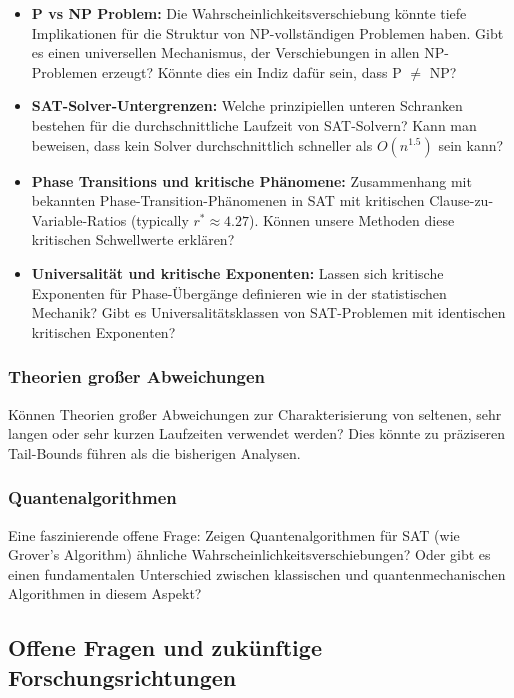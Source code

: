 ﻿\documentclass[a4paper,12pt]{article}
\theoremstyle{definition}
\begin{document}
\begin{itemize}
	\item \textbf{P vs NP Problem:} Die Wahrscheinlichkeitsverschiebung könnte tiefe Implikationen für die Struktur von NP-vollständigen Problemen haben. Gibt es einen universellen Mechanismus, der Verschiebungen in allen NP-Problemen erzeugt? Könnte dies ein Indiz dafür sein, dass P $\neq$ NP?
	
	\item \textbf{SAT-Solver-Untergrenzen:} Welche prinzipiellen unteren Schranken bestehen für die durchschnittliche Laufzeit von SAT-Solvern? Kann man beweisen, dass kein Solver durchschnittlich schneller als $O(n^{1.5})$ sein kann?
	
	\item \textbf{Phase Transitions und kritische Phänomene:} Zusammenhang mit bekannten Phase-Transition-Phänomenen in SAT mit kritischen Clause-zu-Variable-Ratios (typically $r^* \approx 4.27$). Können unsere Methoden diese kritischen Schwellwerte erklären?
	
	\item \textbf{Universalität und kritische Exponenten:} Lassen sich kritische Exponenten für Phase-Übergänge definieren wie in der statistischen Mechanik? Gibt es Universalitätsklassen von SAT-Problemen mit identischen kritischen Exponenten?
\end{itemize}

\subsubsection{Theorien großer Abweichungen}

Können Theorien großer Abweichungen zur Charakterisierung von seltenen, sehr langen oder sehr kurzen Laufzeiten verwendet werden? Dies könnte zu präziseren Tail-Bounds führen als die bisherigen Analysen.

\subsubsection{Quantenalgorithmen}

Eine faszinierende offene Frage: Zeigen Quantenalgorithmen für SAT (wie Grover's Algorithm) ähnliche Wahrscheinlichkeitsverschiebungen? Oder gibt es einen fundamentalen Unterschied zwischen klassischen und quantenmechanischen Algorithmen in diesem Aspekt?

\subsection{Offene Fragen und zukünftige Forschungsrichtungen}
\end{document}
